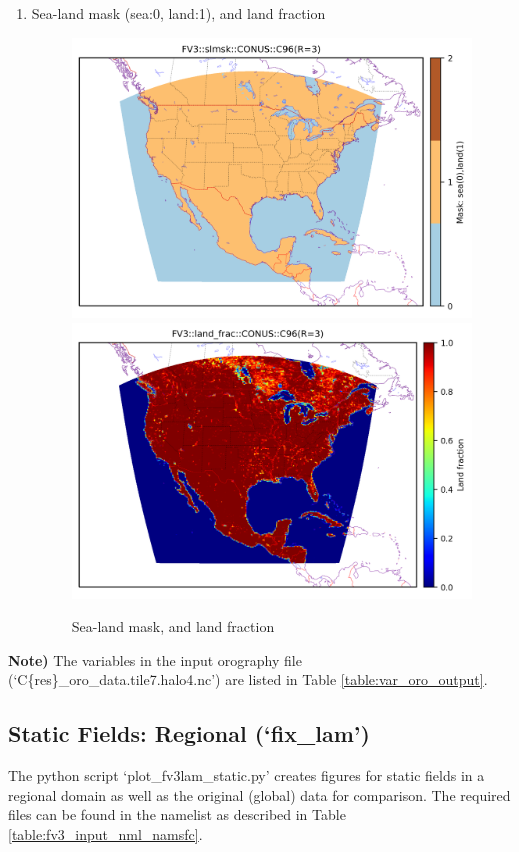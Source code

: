 \documentclass[11pt,fleqn]{report}              %
\begin{document}
\begin{enumerate}
\begin{enumerate}
\item Sea-land mask (sea:0, land:1), and land fraction

\begin{figure}[ht!]
  \centering
  \includegraphics[width=0.48\linewidth]{fv3_orog_CONUS_C96_slmsk.png}
  \includegraphics[width=0.48\linewidth]{fv3_orog_CONUS_C96_land_frac.png}
  \caption{Sea-land mask, and land fraction}
  \label{fig:py_mask}
\end{figure}

\end{enumerate}

{\bf Note)} The variables in the input orography file (`C\{res\}\_oro\_data.tile7.halo4.nc') are listed in Table \ref{table:var_oro_output}.

\end{enumerate}




\subsection{Static Fields: Regional (`fix\_lam')}
\label{subsec:plot_sfc_climo}

The python script `plot\_fv3lam\_static.py' creates figures for static fields in a regional domain as well as the original (global) data for comparison. The required files can be found in the namelist as described in Table \ref{table:fv3_input_nml_namsfc}.
\end{document}
